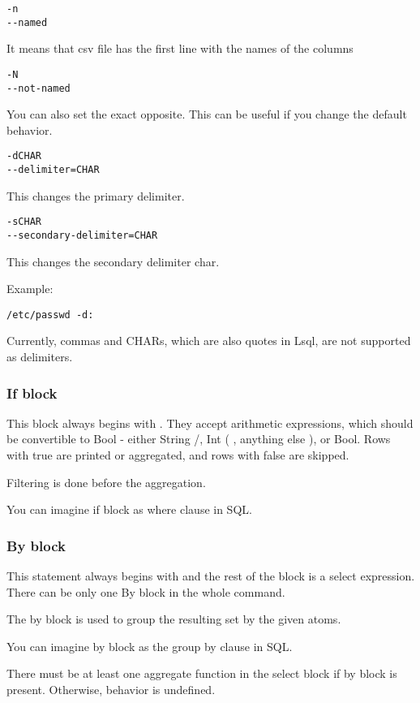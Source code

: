 \begin{verbatim}
-n
--named
\end{verbatim}
It means that csv file has the first line with the names of the columns

\begin{verbatim}
-N
--not-named
\end{verbatim}
You can also set the exact opposite. This can be useful if you change the default behavior.

\begin{verbatim}
-dCHAR
--delimiter=CHAR
\end{verbatim}
This changes the primary delimiter.

\begin{verbatim}
-sCHAR
--secondary-delimiter=CHAR
\end{verbatim}
This changes the secondary delimiter char.

Example:
\begin{verbatim}
/etc/passwd -d:
\end{verbatim}

Currently, commas and CHARs, which are also quotes in Lsql, are not supported as delimiters.

\subsubsection{If block}
This block always begins with . They accept arithmetic expressions, which should be convertible to Bool - either String /, Int ( , anything else ), or Bool. 
Rows with true are printed or aggregated, and rows with false are skipped.

Filtering is done before the aggregation.

You can imagine if block as where clause in SQL.

\subsubsection{By block}
This statement always begins with  and the rest of the block is a select expression. There can be only one By block in the whole command.

The by block is used to group the resulting set by the given atoms.

You can imagine by block as the group by clause in SQL. 

There must be at least one aggregate function in the select block if by block is present. Otherwise, behavior is undefined.

